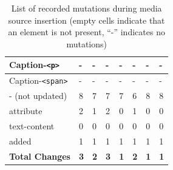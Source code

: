 \documentclass[a4paper, 12pt]{article}
\begin{document}
\begin{table}[!ht]
\begin{adjustbox}{angle=90}
\begin{tabular}{|l|l|l|l|l|l|l|l|}
      Caption-\verb|<p>|              & -                 & -               & -                   & -             & -               & -               & -               \\ \hline
      Caption-\verb|<span>|           & -                 & -               & -                   & -             & -               & -               & -               \\ \hline
      \hline
      - (not updated)                 & 8                 & 7               & 7                   & 7             & 6               & 8               & 8               \\ \hline
      \hline
      attribute                       & 2                 & 1               & 2                   & 0             & 1               & 0               & 0               \\ \hline
      text-content                    & 0                 & 0               & 0                   & 0             & 0               & 0               & 0               \\ \hline
      added                           & 1                 & 1               & 1                   & 1             & 1               & 1               & 1               \\ \hline
      \hline
      \textbf{Total Changes}          & \textbf{3}        & \textbf{2}      & \textbf{3}          & \textbf{1}    & \textbf{2}      & \textbf{1}      & \textbf{1}      \\ \hline
      \end{tabular}
  \end{adjustbox}
  \caption{List of recorded mutations during media source insertion (empty cells indicate that an element is not present, \enquote{-} indicates no mutations)}
  \label{tab:mutations:mediaSourceInsertion}
\end{table}
\end{document}
